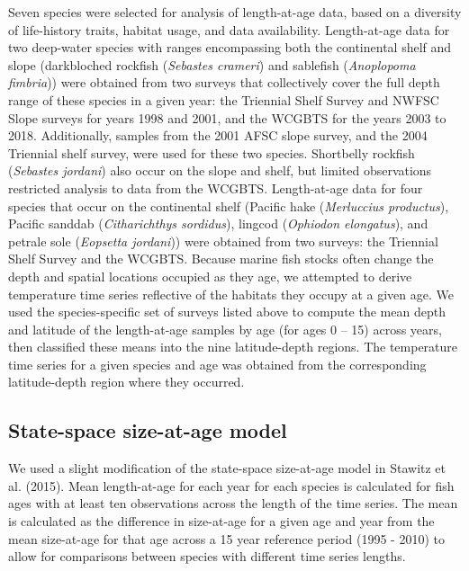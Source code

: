 \documentclass[
]{article}
\begin{document}
Seven species were selected for analysis of length-at-age data, based on
a diversity of life-history traits, habitat usage, and data
availability. Length-at-age data for two deep-water species with ranges
encompassing both the continental shelf and slope (darkbloched rockfish
(\emph{Sebastes crameri}) and sablefish (\emph{Anoplopoma fimbria}))
were obtained from two surveys that collectively cover the full depth
range of these species in a given year: the Triennial Shelf Survey and
NWFSC Slope surveys for years 1998 and 2001, and the WCGBTS for the
years 2003 to 2018. Additionally, samples from the 2001 AFSC slope
survey, and the 2004 Triennial shelf survey, were used for these two
species. Shortbelly rockfish (\emph{Sebastes jordani}) also occur on the
slope and shelf, but limited observations restricted analysis to data
from the WCGBTS. Length-at-age data for four species that occur on the
continental shelf (Pacific hake (\emph{Merluccius productus}), Pacific
sanddab (\emph{Citharichthys sordidus}), lingcod (\emph{Ophiodon
elongatus}), and petrale sole (\emph{Eopsetta jordani})) were obtained
from two surveys: the Triennial Shelf Survey and the WCGBTS. Because
marine fish stocks often change the depth and spatial locations occupied
as they age, we attempted to derive temperature time series reflective
of the habitats they occupy at a given age. We used the species-specific
set of surveys listed above to compute the mean depth and latitude of
the length-at-age samples by age (for ages 0 -- 15) across years, then
classified these means into the nine latitude-depth regions. The
temperature time series for a given species and age was obtained from
the corresponding latitude-depth region where they occurred.

\hypertarget{state-space-size-at-age-model}{%
\subsection{State-space size-at-age
model}\label{state-space-size-at-age-model}}

We used a slight modification of the state-space size-at-age model in
Stawitz et al. (2015). Mean length-at-age for each year for each species
is calculated for fish ages with at least ten observations across the
length of the time series. The mean is calculated as the difference in
size-at-age for a given age and year from the mean size-at-age for that
age across a 15 year reference period (1995 - 2010) to allow for
comparisons between species with different time series lengths.
\end{document}
